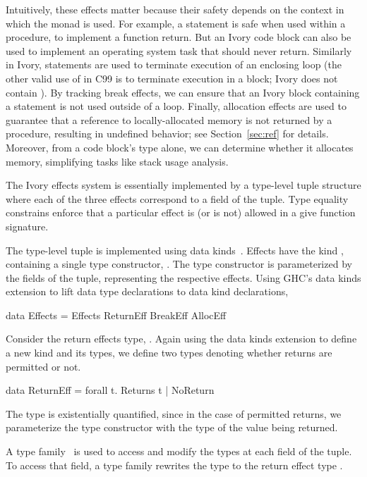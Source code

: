 Intuitively, these effects matter because their safety depends on the context in
which the monad is used. For example, a  statement is safe when used
within a procedure, to implement a function return. But an Ivory code block can
also be used to implement an operating system task that should never
return. Similarly in Ivory,  statements are used to terminate
execution of an enclosing loop (the other valid use of  in C99 is to
terminate execution in a  block; Ivory does not contain
). By tracking break effects, we can ensure that an Ivory block
containing a  statement is not used outside of a loop. Finally,
allocation effects are used to guarantee that a reference to locally-allocated
memory is not returned by a procedure, resulting in undefined behavior; see
Section~\ref{sec:ref} for details. Moreover, from a code block's type alone, we
can determine whether it allocates memory, simplifying tasks like stack usage
analysis.

The Ivory effects system is essentially implemented by a type-level tuple
structure where each of the three effects correspond to a field of the
tuple. Type equality constrains enforce that a particular effect is (or is not)
allowed in a give function signature.

The type-level tuple is implemented using data kinds~\cite{data-kinds}. Effects have the
kind , containing a single type constructor, . The type
constructor  is parameterized by the fields of the tuple,
representing the respective effects. Using GHC's data kinds extension to lift
data type declarations to data kind declarations,
\begin{code}
data Effects = Effects ReturnEff BreakEff AllocEff
\end{code}

\noindent
Consider the return effects type, .  Again using the data kinds
extension to define a new kind and its types, we define two types denoting
whether returns are permitted or not.

\begin{code}
data ReturnEff = forall t. Returns t | NoReturn
\end{code}

\noindent
The type is existentially quantified, since in the case of permitted returns, we
parameterize the type constructor with the type of the value being returned.

A type family~\cite{typefamilies} is used to access and modify the types at each field of
the tuple. To access that field, a type family rewrites the  type to
the return effect type .

